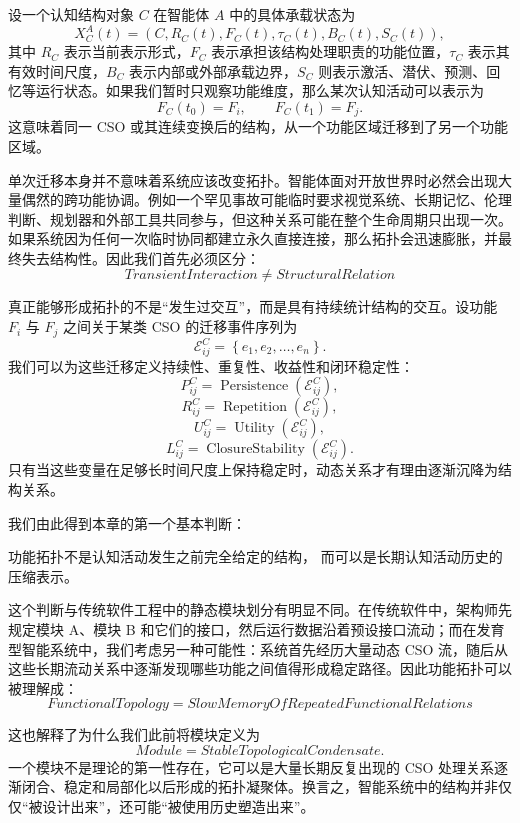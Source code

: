 设一个认知结构对象 $C$ 在智能体 $A$ 中的具体承载状态为
\[
X_C^A(t)
=
\left(
C,
R_C(t),
F_C(t),
\tau_C(t),
B_C(t),
S_C(t)
\right),
\]
其中 $R_C$ 表示当前表示形式，$F_C$ 表示承担该结构处理职责的功能位置，$\tau_C$ 表示其有效时间尺度，$B_C$ 表示内部或外部承载边界，$S_C$ 则表示激活、潜伏、预测、回忆等运行状态。如果我们暂时只观察功能维度，那么某次认知活动可以表示为
\[
F_C(t_0)=F_i,
\qquad
F_C(t_1)=F_j.
\]
这意味着同一 CSO 或其连续变换后的结构，从一个功能区域迁移到了另一个功能区域。

单次迁移本身并不意味着系统应该改变拓扑。智能体面对开放世界时必然会出现大量偶然的跨功能协调。例如一个罕见事故可能临时要求视觉系统、长期记忆、伦理判断、规划器和外部工具共同参与，但这种关系可能在整个生命周期只出现一次。如果系统因为任何一次临时协同都建立永久直接连接，那么拓扑会迅速膨胀，并最终失去结构性。因此我们首先必须区分：
\[
\boxed{
TransientInteraction
\neq
StructuralRelation
}
\]

真正能够形成拓扑的不是``发生过交互''，而是具有持续统计结构的交互。设功能 $F_i$ 与 $F_j$ 之间关于某类 CSO 的迁移事件序列为
\[
\mathcal{E}_{ij}^{C}
=
\left\{
e_1,e_2,\ldots,e_n
\right\}.
\]
我们可以为这些迁移定义持续性、重复性、收益性和闭环稳定性：
\[
P_{ij}^{C}
=
\operatorname{Persistence}
\left(
\mathcal{E}_{ij}^{C}
\right),
\]
\[
R_{ij}^{C}
=
\operatorname{Repetition}
\left(
\mathcal{E}_{ij}^{C}
\right),
\]
\[
U_{ij}^{C}
=
\operatorname{Utility}
\left(
\mathcal{E}_{ij}^{C}
\right),
\]
\[
L_{ij}^{C}
=
\operatorname{ClosureStability}
\left(
\mathcal{E}_{ij}^{C}
\right).
\]
只有当这些变量在足够长时间尺度上保持稳定时，动态关系才有理由逐渐沉降为结构关系。

我们由此得到本章的第一个基本判断：
\begin{proposition*}
功能拓扑不是认知活动发生之前完全给定的结构，
而可以是长期认知活动历史的压缩表示。
\end{proposition*}

这个判断与传统软件工程中的静态模块划分有明显不同。在传统软件中，架构师先规定模块 A、模块 B 和它们的接口，然后运行数据沿着预设接口流动；而在发育型智能系统中，我们考虑另一种可能性：系统首先经历大量动态 CSO 流，随后从这些长期流动关系中逐渐发现哪些功能之间值得形成稳定路径。因此功能拓扑可以被理解成：
\[
\boxed{
FunctionalTopology
=
SlowMemoryOfRepeatedFunctionalRelations
}
\]

这也解释了为什么我们此前将模块定义为
\[
Module
=
StableTopologicalCondensate.
\]
一个模块不是理论的第一性存在，它可以是大量长期反复出现的 CSO 处理关系逐渐闭合、稳定和局部化以后形成的拓扑凝聚体。换言之，智能系统中的结构并非仅仅``被设计出来''，还可能``被使用历史塑造出来''。

